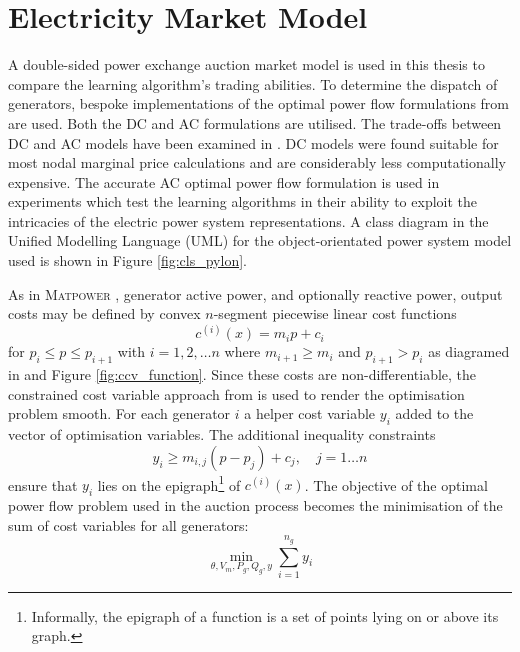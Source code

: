 \section{Electricity Market Model}
A double-sided power exchange auction market model is used in this
thesis to compare the learning algorithm's trading abilities.  To determine the
dispatch of generators, bespoke implementations of the optimal power flow
formulations from \matpower \cite[\S5]{pserc:mp_manual} are used.  Both the DC
and AC formulations are utilised. The trade-offs between DC and AC models have
been examined in . DC models were found suitable for most
nodal marginal price calculations and are considerably less computationally
expensive. The accurate AC optimal power flow formulation is used in
experiments which test the learning algorithms in their ability to exploit the
intricacies of the electric power system representations.  A class diagram in
the Unified Modelling Language (UML) for the object-orientated power system
model used is shown in Figure \ref{fig:cls_pylon}.

%

As in \textsc{Matpower} \cite[p.26]{pserc:mp_manual}, generator active
power, and optionally reactive power, output costs may be defined by convex
$n$-segment piecewise linear cost functions
\begin{equation}
c^{(i)}(x) = m_ip + c_i
\end{equation}
for $p_i \leq p \leq p_{i+1}$ with $i = 1,2,\dotsc n$ where $m_{i+1} \geq m_i$
and $p_{i+1} > p_i$ as diagramed in  and
Figure \ref{fig:ccv_function}. Since these costs are non-differentiable, the
constrained cost variable approach from \cite{zimmerman:ccv} is used to render
the optimisation problem smooth.  For each generator $i$ a helper cost
variable $y_i$ added to the vector of optimisation variables.  The additional
inequality constraints
\begin{equation}
y_i \geq m_{i,j}(p-p_j) + c_j, \quad j = 1\dotsc n
\end{equation}
ensure that $y_i$ lies on the epigraph\footnote{Informally, the epigraph of a
function is a set of points lying on or above its graph.} of $c^{(i)}(x)$. The
objective of the optimal power flow problem used in the auction process
becomes the minimisation of the sum of cost variables for all generators:
\begin{equation}
\min_{\theta, V_m, P_g, Q_g, y} \sum_{i=1}^{n_g}y_i
\end{equation}

